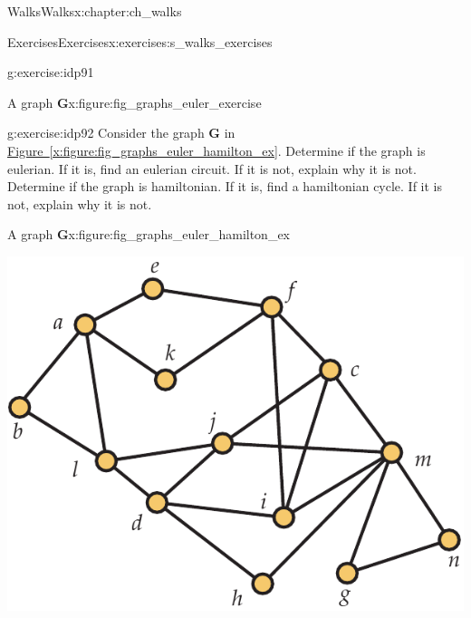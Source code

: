\documentclass[oneside,10pt,]{book}
\newcommand{\xreffont}{\relax}
\numberwithin{equation}{section}
\newcommand{\bfG}{\mathbf{G}}
\begin{document}
\begin{chapterptx}{Walks}{}{Walks}{}{}{x:chapter:ch_walks}
\begin{exercises-section}{Exercises}{}{Exercises}{}{}{x:exercises:s_walks_exercises}
\begin{divisionexercise}{3}{}{}{g:exercise:idp91}
\begin{figureptx}{A graph \(\bfG\)}{x:figure:fig_graphs_euler_exercise}{}%
\begin{image}{0.125}{0.75}{0.125}%
%
\end{image}%
\tcblower
\end{figureptx}%
\end{divisionexercise}%
\begin{divisionexercise}{4}{}{}{g:exercise:idp92}%
Consider the graph \(\bfG\) in \hyperref[x:figure:fig_graphs_euler_hamilton_ex]{Figure~{\xreffont\ref{x:figure:fig_graphs_euler_hamilton_ex}}}. Determine if the graph is eulerian. If it is, find an eulerian circuit. If it is not, explain why it is not. Determine if the graph is hamiltonian. If it is, find a hamiltonian cycle. If it is not, explain why it is not.%
\begin{figureptx}{A graph \(\bfG\)}{x:figure:fig_graphs_euler_hamilton_ex}{}%
\begin{image}{0.175}{0.65}{0.175}%
\includegraphics[width=\linewidth]{images/euler_hamilton_ex}
\end{image}%
\tcblower
\end{figureptx}%
\end{divisionexercise}%
\end{exercises-section}
\end{chapterptx}
\end{document}
